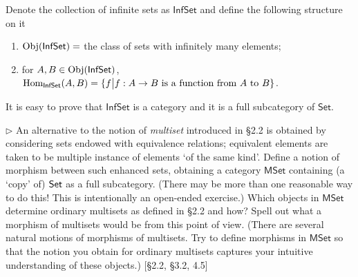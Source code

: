 \begin{solution}
Denote the collection of infinite sets as $\mathsf{InfSet}$ and define the following structure on it
\begin{enumerate}
\item $\mathrm{Obj}(\mathsf{InfSet})=$ the class of sets with infinitely many elements;
\item for $A, B\in \mathrm{Obj}(\mathsf{InfSet})$, $\mathrm{Hom}_{\mathsf{InfSet}}(A,B) = \{f \big{|} f: A\to B \text{ is a function from } A \text{ to } B\}$.
\end{enumerate}
It is easy to prove that $\mathsf{InfSet}$ is a category and it is a full subcategory of $\mathsf{Set}$.
\end{solution}

\hypertarget{Exercise I.3.9}{}
\begin{problem}[3.9]
  $\rhd$ An alternative to the notion of \textit{multiset} introduced in
  \S2.2 is obtained by considering sets endowed with equivalence relations;
  equivalent elements are taken to be multiple instance of elements `of the same
  kind'. Define a notion of morphism between such enhanced sets, obtaining a
  category ${\mathsf{MSet}}$ containing (a `copy' of) $\mathsf{Set}$ as a full subcategory. (There
  may be more than one reasonable way to do this! This is intentionally an
  open-ended exercise.) Which objects in $\mathsf{MSet}$ determine ordinary multisets as
  defined in \S2.2 and how? Spell out what a morphism of multisets would be from
  this point of view. (There are several natural motions of morphisms of
  multisets. Try to define morphisms in $\mathsf{MSet}$ so that the notion you obtain for
  ordinary multisets captures your intuitive understanding of these objects.)
  [\S2.2, \S3.2, 4.5]
\end{problem}

